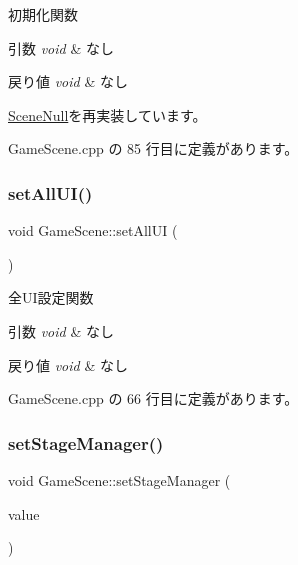 初期化関数 


\begin{DoxyParams}{引数}
{\em void} & なし \\
\hline
\end{DoxyParams}

\begin{DoxyRetVals}{戻り値}
{\em void} & なし \\
\hline
\end{DoxyRetVals}


\mbox{\hyperlink{class_scene_null_a6b27830a755687f2c00149bcfa739388}{Scene\+Null}}を再実装しています。



 Game\+Scene.\+cpp の 85 行目に定義があります。

\mbox{\label{class_game_scene_a91e9e6ce0d780a1a673a79176069634b}} 
\subsubsection{\texorpdfstring{set\+All\+U\+I()}{setAllUI()}}
{\footnotesize\ttfamily void Game\+Scene\+::set\+All\+UI (\begin{DoxyParamCaption}{ }\end{DoxyParamCaption})}



全\+U\+I設定関数 


\begin{DoxyParams}{引数}
{\em void} & なし \\
\hline
\end{DoxyParams}

\begin{DoxyRetVals}{戻り値}
{\em void} & なし \\
\hline
\end{DoxyRetVals}


 Game\+Scene.\+cpp の 66 行目に定義があります。

\mbox{\label{class_game_scene_a22d5ace2b0834672d2a3d4044cda8b8e}} 
\subsubsection{\texorpdfstring{set\+Stage\+Manager()}{setStageManager()}}
{\footnotesize\ttfamily void Game\+Scene\+::set\+Stage\+Manager (\begin{DoxyParamCaption}\item[{\mbox{\hyperlink{class_stage_manager}{Stage\+Manager}} $\ast$}]{value }\end{DoxyParamCaption})}



